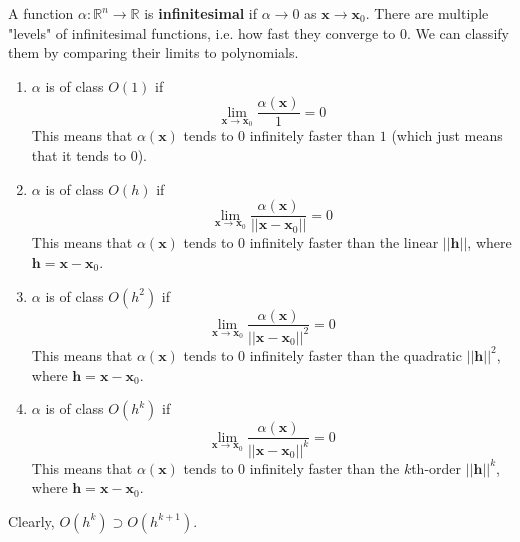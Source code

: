   \begin{definition}
  A function $\alpha: \mathbb{R}^n \longrightarrow \mathbb{R}$ is \textbf{infinitesimal} if $\alpha \rightarrow 0$ as $\mathbf{x} \rightarrow \mathbf{x}_0$. There are multiple "levels" of infinitesimal functions, i.e. how fast they converge to $0$. We can classify them by comparing their limits to polynomials. 
  \begin{enumerate}
      \item $\alpha$ is of class $O(1)$ if 
      \[\lim_{\mathbf{x} \rightarrow \mathbf{x}_0} \frac{\alpha(\mathbf{x})}{1} = 0\]
      This means that $\alpha(\mathbf{x})$ tends to $0$ infinitely faster than $1$ (which just means that it tends to $0$). 
      
      \item $\alpha$ is of class $O(h)$ if 
      \[\lim_{\mathbf{x} \rightarrow \mathbf{x}_0}
      \frac{\alpha(\mathbf{x})}{||\mathbf{x} - \mathbf{x}_0||} = 0\]
      This means that $\alpha(\mathbf{x})$ tends to $0$ infinitely faster than the linear $||\mathbf{h}||$, where $\mathbf{h} = \mathbf{x} - \mathbf{x}_0$. 
      
      \item $\alpha$ is of class $O(h^2)$ if 
      \[\lim_{\mathbf{x} \rightarrow \mathbf{x}_0} \frac{\alpha(\mathbf{x})}{||\mathbf{x} - \mathbf{x}_0||^2} = 0\]
      This means that $\alpha(\mathbf{x})$ tends to $0$ infinitely faster than the quadratic $||\mathbf{h}||^2$, where $\mathbf{h} = \mathbf{x} - \mathbf{x}_0$. 
      
      \item $\alpha$ is of class $O(h^k)$ if 
      \[\lim_{\mathbf{x} \rightarrow \mathbf{x}_0} \frac{\alpha(\mathbf{x})}{||\mathbf{x} - \mathbf{x}_0||^k} = 0\]
      This means that $\alpha(\mathbf{x})$ tends to $0$ infinitely faster than the $k$th-order $||\mathbf{h}||^k$, where $\mathbf{h} = \mathbf{x} - \mathbf{x}_0$. 
  \end{enumerate}
  Clearly, $O(h^k) \supset O(h^{k+1})$. 
  \end{definition}

